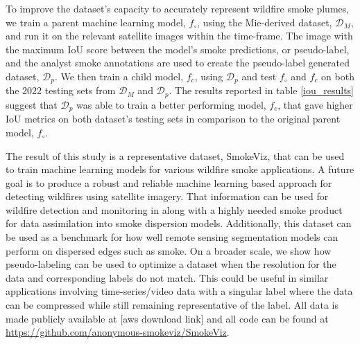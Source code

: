 \documentclass{article}
\begin{document}
To improve the dataset's capacity to accurately represent wildfire smoke plumes, we train a parent machine learning model, \(f_{\circ}\), using the Mie-derived dataset, \(\mathcal{D}_M\), and run it on the relevant satellite images within the time-frame. The image with the maximum IoU score between the model's smoke predictions, or pseudo-label, and the analyst smoke annotations are used to create the pseudo-label generated dataset, \(\mathcal{D}_{p}\). We then train a child model, \(f_c\), using \(\mathcal{D}_{p}\) and test \(f_{\circ}\) and \(f_c\) on both the 2022 testing sets from \(\mathcal{D}_{M}\) and \(\mathcal{D}_{p}\). The results reported in table \ref{iou_results} suggest that \(\mathcal{D}_{p}\) was able to train a better performing model, \(f_c\), that gave higher IoU metrics on both dataset's testing sets in comparison to the original parent model, \(f_{\circ}\).

The result of this study is a representative dataset, SmokeViz, that can be used to train machine learning models for various wildfire smoke applications. A future goal is to produce a robust and reliable machine learning based approach for detecting wildfires using satellite imagery. That information can be used for wildfire detection and monitoring in along with a highly needed smoke product for data assimilation into smoke dispersion models. Additionally, this dataset can be used as a benchmark for how well remote sensing segmentation models can perform on dispersed edges such as smoke. On a broader scale, we show how pseudo-labeling can be used to optimize a dataset when the resolution for the data and corresponding labels do not match. This could be useful in similar applications involving time-series/video data with a singular label where the data can be compressed while still remaining representative of the label. All data is made publicly available at [aws download link] and all code can be found at \url{https://github.com/anonymous-smokeviz/SmokeViz}.







\end{document}
